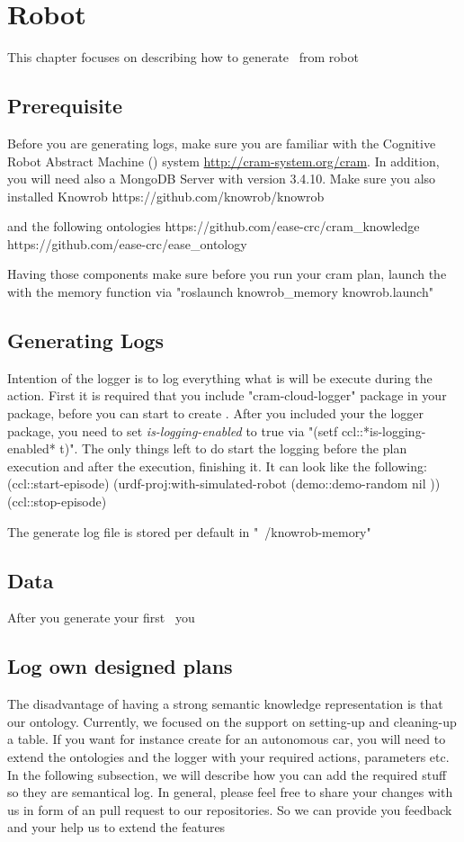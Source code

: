 \chapter{Robot \neems}

This chapter focuses on describing how to generate \neems~from robot 

\section{Prerequisite}

Before you are generating logs, make sure you are familiar with the Cognitive Robot Abstract Machine (\cram) system \url{http://cram-system.org/cram}.
In addition, you will need also a MongoDB Server with version 3.4.10.
Make sure you also installed Knowrob
https://github.com/knowrob/knowrob

and the following ontologies
https://github.com/ease-crc/cram\_knowledge
https://github.com/ease-crc/ease\_ontology

Having those components make sure before you run your cram plan, launch the \knowrob with the memory function via "roslaunch knowrob\_memory knowrob.launch"



\section{Generating Logs}
Intention of the logger is to log everything what is will be execute during the \cram action.
First it is required that you include "cram-cloud-logger" package in your \cram package, before you can start to create \neems.
After you included your the logger package, you need to set \textit{is-logging-enabled} to true via "(setf ccl::*is-logging-enabled* t)".
The only things left to do start the logging before the plan execution and after the execution, finishing it.
It can look like the following:
	(ccl::start-episode)
	(urdf-proj:with-simulated-robot (demo::demo-random nil ))
	(ccl::stop-episode)
	
The generate log file is stored per default in "~/knowrob-memory" 

\section{Data}
After you generate your first \neem~you
\section{Log own designed plans}
The disadvantage of having a strong semantic knowledge representation is that our ontology.
Currently, we focused on the support on setting-up and cleaning-up a table.
If you want for instance create \neems for an autonomous car, you will need to extend the \ease ontologies and the logger with your required actions, parameters etc.
In the following subsection, we will describe how you can add the required stuff so they are semantical log.
In general, please feel free to share your changes with us in form of an pull request to our repositories.
So we can provide you feedback and your help us to extend the features

